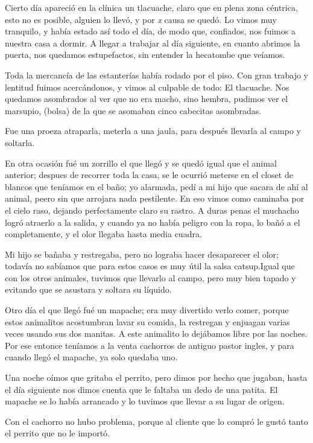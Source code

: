 \documentclass[letterpaper, 12pt]{book}
\begin{document}
Cierto día apareció en la clínica un tlacuache, claro que en plena zona céntrica, esto no es posible, alguien lo llevó, y por \textit{x } causa se quedó. Lo vimos muy tranquilo, y había estado así todo el día, de modo que, confiados, nos fuimos a nuestra casa a dormir. A llegar a trabajar al día siguiente, en cuanto abrimos la puerta, nos quedamos estupefactos, sin entender la hecatombe que veíamos.

Toda la mercancía de las estanterías había rodado por el piso. Con gran trabajo y lentitud fuimos acercándonos, y vimos al culpable de todo: El tlacuache. Nos quedamos asombrados al ver que no era macho, sino hembra, pudimos ver el marsupio, (bolsa) de la que se asomaban cinco cabecitas asombradas.

Fue una proeza atraparla, meterla a una jaula, para después llevarla al campo y soltarla.

En otra ocasión fué un zorrillo el que llegó y se quedó igual que el animal anterior; despues de recorrer toda la casa, se le ocurrió meterse en el closet de blancos que teníamos en el baño; yo alarmada, pedí a mi hijo que sacara de ahí al animal, peero sin que arrojara nada pestilente. En eso vimos como caminaba por el cielo raso, dejando perfectamente claro su rastro. A duras penas el muchacho logró atraerlo a la salida, y cuando ya no había peligro con la ropa, lo bañó a el completamente, y el olor llegaba hasta media cuadra.

Mi hijo se bañaba y restregaba, pero no lograba hacer desaparecer el olor; todavía no sabíamos que para estos casos es muy útil la salsa catsup.Igual que con los otros animales, tuvimos que llevarlo al campo, pero muy bien tapado y evitando que se asustara y soltara su líquido. 

Otro día el que llegó fué un mapache; era muy divertido verlo comer, porque estos animalitos acostumbran lavar su comida, la restregan y enjuagan varias veces usando sus dos manitas. A este animalito lo dejábamos libre por las noches. Por ese entonce teníamos a la venta cachorros de antiguo pastor ingles, y para cuando llegó el mapache, ya solo quedaba uno.

Una noche oímos que gritaba el perrito, pero dimos por hecho que jugaban, hasta el día siguiente nos dimos cuenta que le faltaba un dedo de una patita. El mapache se lo había arrancado y lo tuvimos que llevar a su lugar de origen.

Con el cachorro no hubo problema, porque al cliente que lo compró le gustó tanto el perrito que no le importó.
\end{document}
